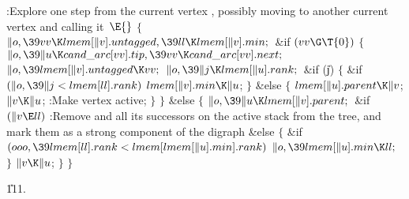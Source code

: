 \Y\B\4:Explore one step from the current vertex , possibly moving
to another current vertex and calling it~\X${}\E{}$\6
${}\{{}$\1\6
${}\|o,\39\\{vv}\K\\{lmem}[\|v].\\{untagged},\39\\{ll}\K\\{lmem}[\|v].%
\\{min};{}$\6
\&{if} ${}(\\{vv}\G\T{0}){}$\5
${}\{{}$\1\6
${}\|o,\39\|u\K\\{cand\_arc}[\\{vv}].\\{tip},\39\\{vv}\K\\{cand\_arc}[\\{vv}].%
\\{next};{}$\6
${}\|o,\39\\{lmem}[\|v].\\{untagged}\K\\{vv};{}$\6
${}\|o,\39\|j\K\\{lmem}[\|u].\\{rank};{}$\6
\&{if} (\|j)\5
${}\{{}$\1\6
\&{if} ${}(\|o,\39\|j<\\{lmem}[\\{ll}].\\{rank}){}$\1\5
${}\\{lmem}[\|v].\\{min}\K\|u{}$;%
\2\6
\4${}\}{}$\5
\2\&{else}\5
${}\{{}$\1\6
${}\\{lmem}[\|u].\\{parent}\K\|v{}$;\6
${}\|v\K\|u{}$;\6
:Make vertex  active\X;\6
\4${}\}{}$\2\6
\4${}\}{}$\5
\2\&{else}\5
${}\{{}$\1\6
${}\|o,\39\|u\K\\{lmem}[\|v].\\{parent};{}$\6
\&{if} ${}(\|v\E\\{ll}){}$\1\5
:Remove  and all its successors on the active stack from the tree,
and mark them as a strong component of the digraph\X\2\6
\&{else}\5
${}\{{}$\1\6
\&{if} ${}(\\{ooo},\39\\{lmem}[\\{ll}].\\{rank}<\\{lmem}[\\{lmem}[\|u].%
\\{min}].\\{rank}){}$\1\5
${}\|o,\39\\{lmem}[\|u].\\{min}\K\\{ll};{}$\2\6
\4${}\}{}$\2\6
${}\|v\K\|u{}$;\6
\4${}\}{}$\2\6
\4${}\}{}$\2\par
\U111.\fi

